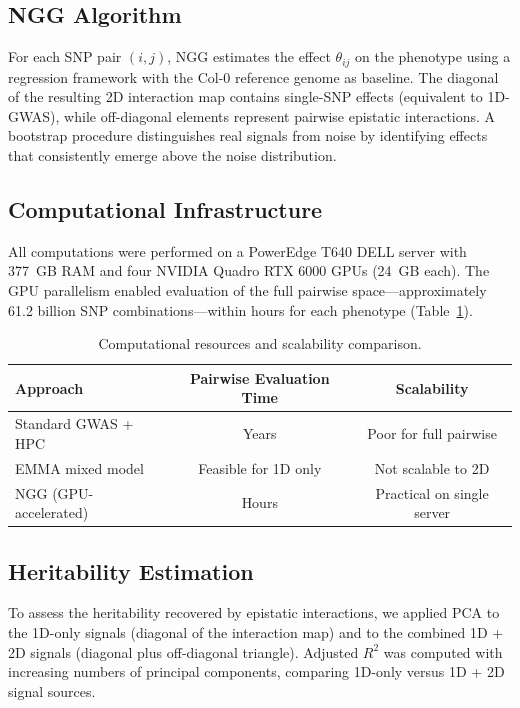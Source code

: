 \documentclass[11pt]{article}
\begin{document}
\subsection{NGG Algorithm}

For each SNP pair $(i, j)$, NGG estimates the effect $\theta_{ij}$ on the phenotype using a regression framework with the Col-0 reference genome as baseline. The diagonal of the resulting 2D interaction map contains single-SNP effects (equivalent to 1D-GWAS), while off-diagonal elements represent pairwise epistatic interactions. A bootstrap procedure distinguishes real signals from noise by identifying effects that consistently emerge above the noise distribution.

\subsection{Computational Infrastructure}

All computations were performed on a PowerEdge T640 DELL server with 377~GB RAM and four NVIDIA Quadro RTX 6000 GPUs (24~GB each). The GPU parallelism enabled evaluation of the full pairwise space---approximately 61.2 billion SNP combinations---within hours for each phenotype (Table~\ref{tab:compute}).

\begin{table}[htbp]
\centering
\caption{Computational resources and scalability comparison.}
\label{tab:compute}
\begin{tabular}{lcc}
\toprule
Approach & Pairwise Evaluation Time & Scalability \\
\midrule
Standard GWAS + HPC & Years & Poor for full pairwise \\
EMMA mixed model & Feasible for 1D only & Not scalable to 2D \\
NGG (GPU-accelerated) & Hours & Practical on single server \\
\bottomrule
\end{tabular}
\end{table}

\subsection{Heritability Estimation}

To assess the heritability recovered by epistatic interactions, we applied PCA to the 1D-only signals (diagonal of the interaction map) and to the combined 1D + 2D signals (diagonal plus off-diagonal triangle). Adjusted $R^2$ was computed with increasing numbers of principal components, comparing 1D-only versus 1D + 2D signal sources.
\end{document}
